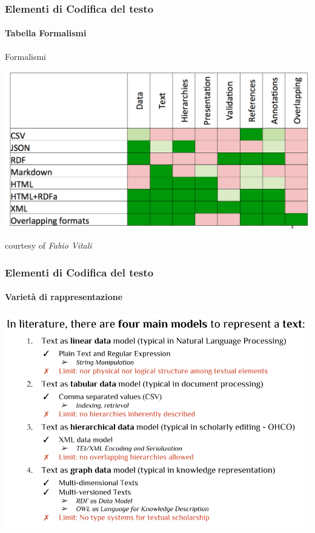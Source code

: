 \begin{frame}
	\frametitle{Elementi di Codifica del testo}
	\framesubtitle{Tabella Formalismi}
	\addtocounter{nframe}{1}

	\begin{block}{Formalismi}
		\begin{center}
			\includegraphics[width=.9\textwidth]{imgs/TabellaFormalismiCodificaTesto.png}
		\end{center}
	\end{block}
	courtesy of \textit{Fabio Vitali}

\end{frame}


\begin{frame}
	\frametitle{Elementi di Codifica del testo}
	\framesubtitle{Varietà di rappresentazione}
	\addtocounter{nframe}{1}

	
		\begin{center}
			\includegraphics[width=.9\textwidth]{imgs/dataModels-slide.png}
		\end{center}
	
	
\end{frame}

